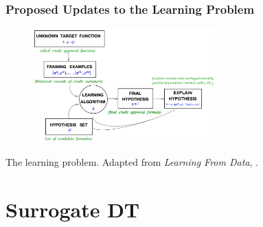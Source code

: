 \documentclass[11pt, 
               aspectratio=169]{beamer}
\begin{document}
	\begin{frame}
	
		\frametitle{Proposed Updates to the Learning Problem}
		
		\begin{figure}[htb]
			\begin{center}
				\includegraphics[height=125pt]{img/learning_problem.png}
				\label{fig:learning_problem}
			\end{center}
		\end{figure}
		
		The learning problem. Adapted from \textit{Learning From Data}, \cite{lfd}.
		
	\end{frame}

	\section{Surrogate DT}
\end{document}
